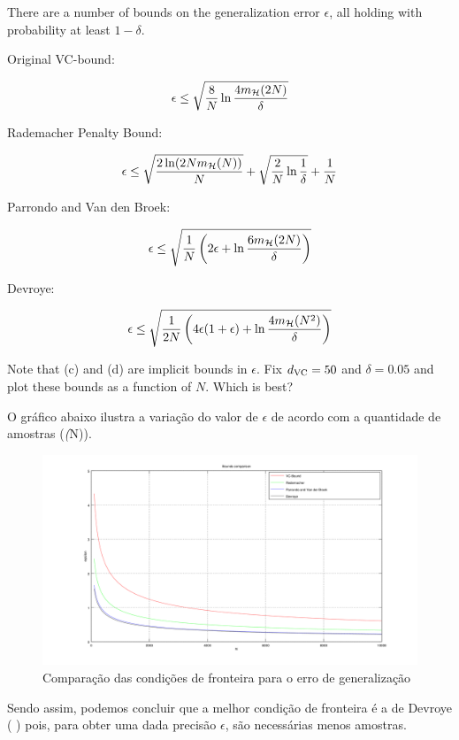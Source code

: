 \begin{enunciado}{20}
    There are a number of bounds on the generalization error $\epsilon$, all holding with probability at least $1 - \delta$.
    
     Original VC-bound:
    
    $$ \epsilon \le \sqrt{\frac{8}{N}\ln\frac{4m_{\mathcal{H}}(2N)}{\delta}} $$
    
     Rademacher Penalty Bound:
    
    $$ \epsilon \le \sqrt{\frac{2\ln(2Nm_{\mathcal{H}}(N))}{N}} + 
    \sqrt{\frac{2}{N}\ln\frac{1}{\delta}} + \frac{1}{N}$$
    
     Parrondo and Van den Broek:
    
    $$ \epsilon \le \sqrt{\frac{1}{N} \left( 2 \epsilon + \ln\frac{6m_{\mathcal{H}}(2N)}{\delta} \right)} $$
    
     Devroye:
    
    $$ \epsilon \le \sqrt{\frac{1}{2N} \left( 4 \epsilon(1+\epsilon) + \ln\frac{4m_{\mathcal{H}}(N^2)}{\delta} \right) } $$
    
    Note that (c) and (d) are implicit bounds in $\epsilon$. Fix $d_{\text{VC}} = 50$ and $\delta = 0.05$ and plot these bounds as a function of $N$. Which is best?
\end{enunciado}

O gráfico abaixo ilustra a variação do valor de $\epsilon$ de acordo com a quantidade de amostras (\emph(N)).

\begin{figure}[H]
    \includegraphics[width=\textwidth]{2-20.png}
    \caption{Comparação das condições de fronteira para o erro de generalização}
    \label{fig:f1}
\end{figure}

Sendo assim, podemos concluir que a melhor condição de fronteira é a de Devroye ( ) pois, para obter uma dada precisão $\epsilon$, são necessárias menos amostras.  
